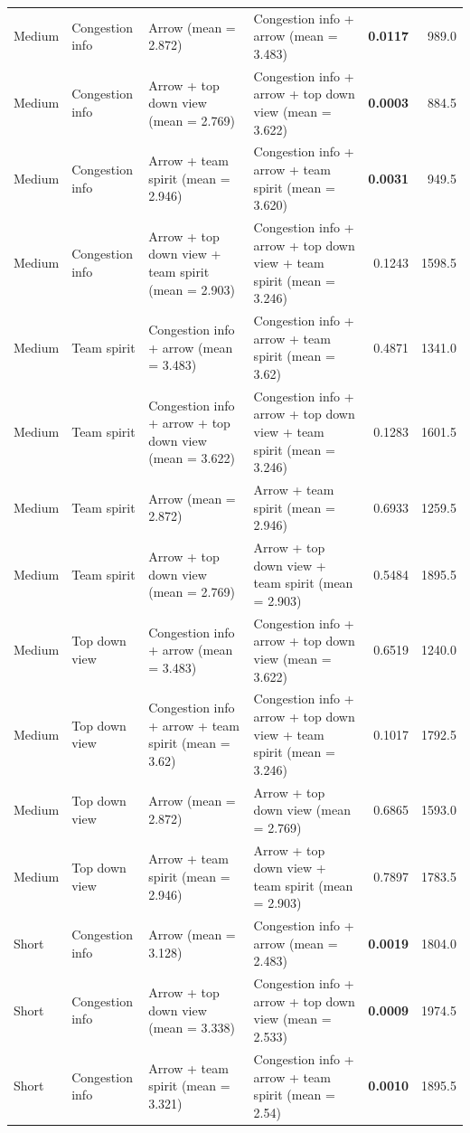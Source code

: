 \begin{table}
\begin{scriptsize}
\begin{tabular}{llllrr}
  \hline
  Medium & Congestion info & Arrow (mean = 2.872) & Congestion info + arrow (mean = 3.483) & \textbf{0.0117} & 989.0 \\ 
  Medium & Congestion info & Arrow + top down view (mean = 2.769) & Congestion info + arrow + top down view (mean = 3.622) & \textbf{0.0003} & 884.5 \\ 
  Medium & Congestion info & Arrow + team spirit (mean = 2.946) & Congestion info + arrow + team spirit (mean = 3.620) & \textbf{0.0031} & 949.5 \\ 
  Medium & Congestion info & Arrow + top down view + team spirit (mean = 2.903) & Congestion info + arrow + top down view + team spirit (mean = 3.246) & 0.1243 & 1598.5 \\ 
  Medium & Team spirit & Congestion info + arrow (mean = 3.483) & Congestion info + arrow + team spirit (mean = 3.62) & 0.4871 & 1341.0 \\ 
  Medium & Team spirit & Congestion info + arrow + top down view (mean = 3.622) & Congestion info + arrow + top down view + team spirit (mean = 3.246) & 0.1283 & 1601.5 \\ 
  Medium & Team spirit & Arrow (mean = 2.872) & Arrow + team spirit (mean = 2.946) & 0.6933 & 1259.5 \\ 
  Medium & Team spirit & Arrow + top down view (mean = 2.769) & Arrow + top down view + team spirit (mean = 2.903) & 0.5484 & 1895.5 \\ 
  Medium & Top down view & Congestion info + arrow (mean = 3.483) & Congestion info + arrow + top down view (mean = 3.622) & 0.6519 & 1240.0 \\ 
  Medium & Top down view & Congestion info + arrow + team spirit (mean = 3.62) & Congestion info + arrow + top down view + team spirit (mean = 3.246) & 0.1017 & 1792.5 \\ 
  Medium & Top down view & Arrow (mean = 2.872) & Arrow + top down view (mean = 2.769) & 0.6865 & 1593.0 \\ 
  Medium & Top down view & Arrow + team spirit (mean = 2.946) & Arrow + top down view + team spirit (mean = 2.903) & 0.7897 & 1783.5 \\ 
  \hline
  Short & Congestion info & Arrow (mean = 3.128) & Congestion info + arrow (mean = 2.483) & \textbf{0.0019} & 1804.0 \\ 
  Short & Congestion info & Arrow + top down view (mean = 3.338) & Congestion info + arrow + top down view (mean = 2.533) & \textbf{0.0009} & 1974.5 \\ 
  Short & Congestion info & Arrow + team spirit (mean = 3.321) & Congestion info + arrow + team spirit (mean = 2.54) & \textbf{0.0010} & 1895.5 \\ 

\end{tabular}
\end{scriptsize}
\end{table}
